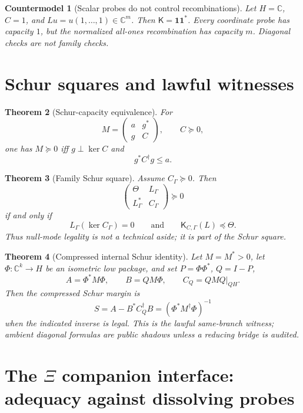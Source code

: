 \documentclass[11pt]{article}
\newtheorem{theorem}{Theorem}[section]
\newtheorem{countermodel}[theorem]{Countermodel}
\newcommand{\K}{\mathsf K}
\newcommand{\Loewner}{\preceq}
\begin{document}
\begin{countermodel}[Scalar probes do not control recombinations]
Let \(H=\mathbb C\), \(C=1\), and \(Lu=u(1,\ldots,1)\in\mathbb C^m\).  Then \(\K=\mathbf 1\mathbf 1^*\).  Every coordinate probe has capacity \(1\), but the normalized all-ones recombination has capacity \(m\).  Diagonal checks are not family checks.
\end{countermodel}

\section{Schur squares and lawful witnesses}

\begin{theorem}[Schur-capacity equivalence]
For
\[
  M=\begin{pmatrix}a&g^*\\ g&C\end{pmatrix},\qquad C\succeq0,
\]
one has \(M\succeq0\) iff \(g\perp\ker C\) and
\[
  g^*C^\dagger g\le a.
\]
\end{theorem}

\begin{theorem}[Family Schur square]
Assume \(C_\Gamma\succeq0\).  Then
\[
  \begin{pmatrix}\Theta&L_\Gamma\\L_\Gamma^*&C_\Gamma\end{pmatrix}\succeq0
\]
if and only if
\[
  L_\Gamma(\ker C_\Gamma)=0
  \qquad\text{and}\qquad
  \K_{C,\Gamma}(L)\Loewner\Theta.
\]
Thus null-mode legality is not a technical aside; it is part of the Schur square.
\end{theorem}

\begin{theorem}[Compressed internal Schur identity]
Let \(M=M^*>0\), let \(\Phi:\mathbb C^k\to H\) be an isometric low package, and set \(P=\Phi\Phi^*\), \(Q=I-P\),
\[
  A=\Phi^*M\Phi,\qquad B=QM\Phi,\qquad C_Q=QMQ|_{QH}.
\]
Then the compressed Schur margin is
\[
  S=A-B^*C_Q^\dagger B=(\Phi^*M^\dagger\Phi)^{-1}
\]
when the indicated inverse is legal.  This is the lawful same-branch witness; ambient diagonal formulas are public shadows unless a reducing bridge is audited.
\end{theorem}


\section{The \texorpdfstring{\(\Xi\)}{Xi} companion interface: adequacy against dissolving probes}
\end{document}
